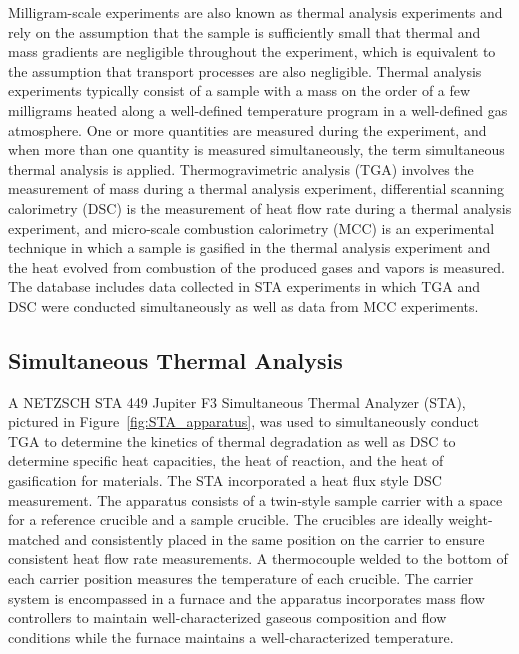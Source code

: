\documentclass[12pt,oneside]{book}
\begin{document}
Milligram-scale experiments are also known as thermal analysis experiments and rely on the assumption that the sample is sufficiently small that thermal and mass gradients are negligible throughout the experiment, which is equivalent to the assumption that transport processes are also negligible. Thermal analysis experiments typically consist of a sample with a mass on the order of a few milligrams heated along a well-defined temperature program in a well-defined gas atmosphere. One or more quantities are measured during the experiment, and when more than one quantity is measured simultaneously, the term simultaneous thermal analysis is applied. Thermogravimetric analysis (TGA) involves the measurement of mass during a thermal analysis experiment, differential scanning calorimetry (DSC) is the measurement of heat flow rate during a thermal analysis experiment, and micro-scale combustion calorimetry (MCC) is an experimental technique in which a sample is gasified in the thermal analysis experiment and the heat evolved from combustion of the produced gases and vapors is measured. The database includes data collected in STA experiments in which TGA and DSC were conducted simultaneously as well as data from MCC experiments. 

\subsection{Simultaneous Thermal Analysis}
\label{sec:sta}

A NETZSCH STA 449 Jupiter F3 Simultaneous Thermal Analyzer (STA), pictured in Figure~\ref{fig:STA_apparatus}, was used to simultaneously conduct TGA to determine the kinetics of thermal degradation as well as DSC to determine specific heat capacities, the heat of reaction, and the heat of gasification for materials. The STA incorporated a heat flux style DSC measurement. The apparatus consists of a twin-style sample carrier with a space for a reference crucible and a sample crucible. The crucibles are ideally weight-matched and consistently placed in the same position on the carrier to ensure consistent heat flow rate measurements. A thermocouple welded to the bottom of each carrier position measures the temperature of each crucible. The carrier system is encompassed in a furnace and the apparatus incorporates mass flow controllers to maintain well-characterized gaseous composition and flow conditions while the furnace maintains a well-characterized temperature.  
\end{document}
